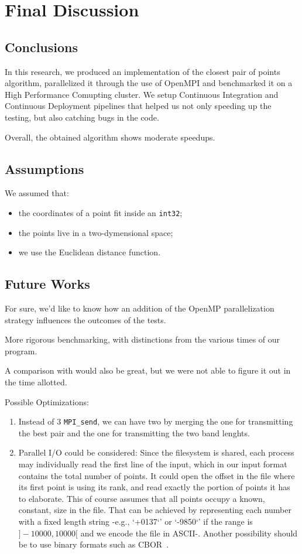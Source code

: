 \section{Final Discussion}
\label{sec:final_discussion}

\subsection{Conclusions}
In this research, we produced an implementation of the closest pair of points algorithm, parallelized it through the use of OpenMPI and benchmarked it on a High Performance Comupting cluster.
We setup Continuous Integration and Continuous Deployment pipelines that helped us not only speeding up the testing, but also catching bugs in the code.

Overall, the obtained algorithm shows moderate speedups.

\subsection{Assumptions}
We assumed that:
\begin{itemize}
    \item the coordinates of a point fit inside an \texttt{int32};
    \item the points live in a two-dymensional space;
    \item we use the Euclidean distance function.
\end{itemize}

\subsection{Future Works}
\label{subsec:future_works}
For sure, we'd like to know how an addition of the OpenMP parallelization strategy influences the outcomes of the tests.

More rigorous benchmarking, with distinctions from the various times of our program.

A comparison with \cite{wang2020parallel} would also be great, but we were not able to figure it out in the time allotted.

Possible Optimizations:
\begin{enumerate}
    \item Instead of 3 \verb|MPI_send|, we can have two by merging the one for transmitting the best pair and the one for transmitting the two band lenghts.
    \item Parallel I/O could be considered: Since the filesystem is shared, each process may individually read the first line of the input, which in our input format contains the total number of points. It could open the offset in the file where its first point is using its rank, and read exactly the portion of points it has to elaborate. This of course assumes that all points occupy a known, constant, size in the file. That can be achieved by representing each number with a fixed length string -e.g., `+0137`' or `-9850`' if the range is $]-10000,10000[$ and we encode the file in ASCII-. Another possibility should be to use binary formats such as CBOR~\cite{bormann2013cbor}.
\end{enumerate}
